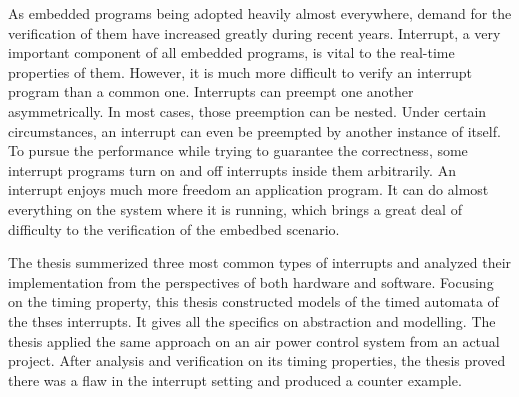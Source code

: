 
\begin{eabstract} 
   As embedded programs being adopted heavily almost everywhere, demand
   for the verification of them have increased greatly during recent years.
   Interrupt, a very important component of all embedded programs, is vital
   to the real-time properties of them. However, it is much more difficult
   to verify an interrupt program than a common one. Interrupts can preempt
   one another asymmetrically. In most cases, those preemption can be nested.
   Under certain circumstances, an interrupt can even be preempted by another
   instance of itself. To pursue the performance while trying to guarantee
   the correctness, some interrupt programs turn on and off interrupts inside 
   them arbitrarily. An interrupt enjoys much more freedom an application
   program. It can do almost everything on the system where it is running, 
   which brings a great deal of difficulty to the verification of the embedbed
   scenario.
	
   The thesis summerized three most common types of interrupts and analyzed
   their implementation from the perspectives of both hardware and software.
   Focusing on the timing property, this thesis constructed models of the 
   timed automata of the thses interrupts. It gives all the specifics on 
   abstraction and modelling. The thesis applied the same approach on an air 
   power control system from an actual project. After analysis and verification 
   on its timing properties, the thesis proved there was a flaw in the 
   interrupt setting and produced a counter example.
\end{eabstract}


